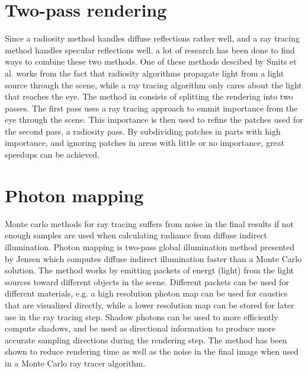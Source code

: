 \documentclass[]{report}   %
\begin{document}
\section{Two-pass rendering}
Since a radiosity method handles diffuse reflections rather well, and a ray tracing method handles specular reflections well. a lot of research has been done to find ways to combine these two methods.
One of these methods descibed by Smits et al. \cite{importance_radiosity} works from the fact that radiosity algorithms propagate light from a light source through the scene, while a ray tracing algorithm only cares about the light that reaches the eye.
The method in \cite{importance_radiosity} consists of splitting the rendering into two passes.
The first pass uses a ray tracing approach to emmit importance from the eye through the scene.
This importance is then used to refine the patches used for the second pass, a radiosity pass.
By subdividing patches in parts with high importance, and ignoring patches in areas with little or no importance, great speedups can be achieved.
 

\section{Photon mapping}
Monte carlo methods for ray tracing suffers from noise in the final results if not enough samples are used when calculating radiance from diffuse indirect illumination.
Photon mapping is two-pass global illumination method presented by Jensen \cite{photon_maps} which computes diffuse indirect illumination faster than a Monte Carlo solution.
The method works by emitting packets of energt (light) from the light sources toward different objects in the scene.
Different packets can be used for different materials, e.g. a high resolution photon map can be used for caustics that are visualized directly, while a lower resolution map can be stored for later use in the ray tracing step.
Shadow photons can be used to more efficiently compute shadows, and be used as directional information to produce more accurate sampling directions during the rendering step.
The method has been shown to reduce rendering time as well as the noise in the final image when used in a Monte Carlo ray tracer algorithm.
  
\end{document}
